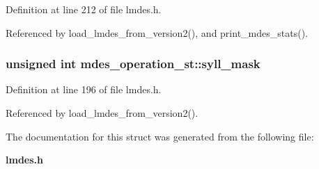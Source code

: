Definition at line 212 of file lmdes.h.

Referenced by load\_\-lmdes\_\-from\_\-version2(), and print\_\-mdes\_\-stats().
\subsubsection{\setlength{\rightskip}{0pt plus 5cm}unsigned int \bf{mdes\_\-operation\_\-st::syll\_\-mask}}\label{structmdes__operation__st_bd067e6ea7dcce6259dcb4589d5b3afd}




Definition at line 196 of file lmdes.h.

Referenced by load\_\-lmdes\_\-from\_\-version2().

The documentation for this struct was generated from the following file:\begin{CompactItemize}
\item 
\bf{lmdes.h}\end{CompactItemize}
